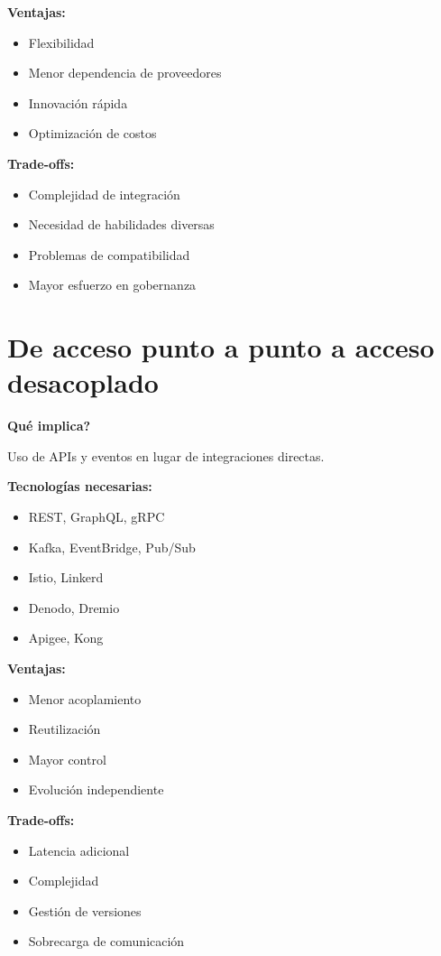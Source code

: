 \documentclass[12pt]{article}
\begin{document}
\textbf{Ventajas:}
\begin{itemize}
\item Flexibilidad
\item Menor dependencia de proveedores
\item Innovaci\'on r\'apida
\item Optimizaci\'on de costos
\end{itemize}

\textbf{Trade-offs:}
\begin{itemize}
\item Complejidad de integraci\'on
\item Necesidad de habilidades diversas
\item Problemas de compatibilidad
\item Mayor esfuerzo en gobernanza
\end{itemize}

\section{De acceso punto a punto a acceso desacoplado}

\textbf{\textquestiondown Qu\'e implica?} \par
Uso de APIs y eventos en lugar de integraciones directas.

\textbf{Tecnolog\'ias necesarias:}
\begin{itemize}
\item REST, GraphQL, gRPC
\item Kafka, EventBridge, Pub/Sub
\item Istio, Linkerd
\item Denodo, Dremio
\item Apigee, Kong
\end{itemize}

\textbf{Ventajas:}
\begin{itemize}
\item Menor acoplamiento
\item Reutilizaci\'on
\item Mayor control
\item Evoluci\'on independiente
\end{itemize}

\textbf{Trade-offs:}
\begin{itemize}
\item Latencia adicional
\item Complejidad
\item Gesti\'on de versiones
\item Sobrecarga de comunicaci\'on
\end{itemize}
\end{document}
